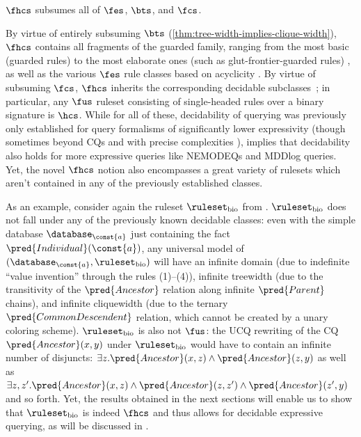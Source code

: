 \begin{corollary}
$\fhcs$ subsumes all of $\fes$, $\bts$, and $\fcs$.
\end{corollary}


By virtue of entirely subsuming $\bts$ (\cref{thm:tree-width-implies-clique-width}), $\fhcs$ contains all fragments of the guarded family, ranging from the most basic (guarded rules) to the most elaborate ones (such as glut-frontier-guarded rules) \cite{BagLecMugSal11,CaliGK13,KrotzschR11}, as well as the various $\fes$ rule classes based on acyclicity \cite{GHKKMMW2013}. 
By virtue of subsuming $\fcs$, $\fhcs$ inherits the corresponding decidable subclasses~\cite{ICDT2023}; in particular, any $\fus$ ruleset consisting of single-headed rules over a binary signature is $\hcs$.
While for all of these, decidability of querying was previously only established for query formalisms of significantly lower expressivity (though sometimes beyond CQs and with precise complexities \cite{ijcai2017-110}),  implies that decidability also holds for more expressive queries like NEMODEQs and MDDlog queries. Yet, the novel $\fhcs$ notion also encompasses a great variety of rulesets which aren't contained in any of the previously established classes.

\begin{example}
As an example, consider again the ruleset $\ruleset_\mathrm{bio}$ from . $\ruleset_\mathrm{bio}$ does not fall under any of the previously known decidable classes: even with the simple database $\database_\const{a}$ just containing the fact $\pred{Individual}(\const{a})$, any universal model of $(\database_\const{a},\ruleset_\mathrm{bio})$ will have an infinite domain (due to indefinite ``value invention'' through the rules (1)--(4)), infinite treewidth (due to the transitivity of the $\pred{Ancestor}$ relation along infinite $\pred{Parent}$ chains), and infinite cliquewidth (due to the ternary $\pred{CommonDescendent}$ relation, which cannot be created by a unary coloring scheme).
%
$\ruleset_\mathrm{bio}$ is also not $\fus$: the UCQ rewriting of the CQ $\pred{Ancestor}(x,y)$ under $\ruleset_\mathrm{bio}$ would have to contain an infinite number of disjuncts: $\exists z.\pred{Ancestor}(x,z) \wedge \pred{Ancestor}(z,y)$ as well as $\exists z,z'.\pred{Ancestor}(x,z) \wedge \pred{Ancestor}(z,z')\wedge \pred{Ancestor}(z',y)$ and so forth.
%
Yet,
the results obtained in the next sections will enable us to show that $\ruleset_\mathrm{bio}$ is indeed $\fhcs$ and thus allows for decidable expressive querying, as will be discussed in .
\end{example}





